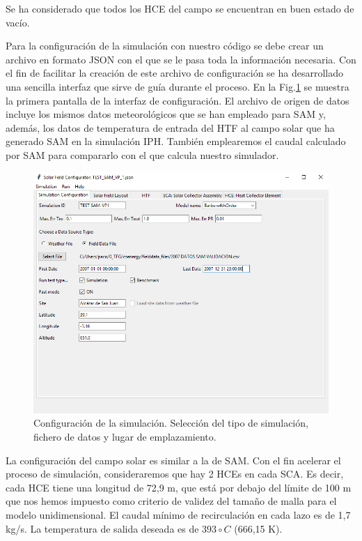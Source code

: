 Se ha considerado que todos los HCE  del campo se encuentran en buen estado de vacío.

Para la configuración de la simulación con nuestro código se debe crear un archivo en formato JSON con el que se le pasa toda la información necesaria. Con el fin de facilitar la creación de este archivo de configuración se ha desarrollado una sencilla interfaz que sirve de guía durante el proceso. En la Fig.\ref{fig:interface01} se muestra la primera pantalla de la interfaz de configuración. El archivo de origen de datos incluye los mismos datos meteorológicos que se han empleado para SAM y, además, los datos de temperatura de entrada del HTF al campo solar que ha generado SAM en la simulación IPH. También emplearemos el caudal calculado por SAM para compararlo con el que calcula nuestro simulador.

\begin{figure}[!h]
\includegraphics[width=0.9\linewidth]{images/interface01.png}
\caption{Configuración de la simulación. Selección del tipo de simulación, fichero de datos y lugar de emplazamiento.} 
\label{fig:interface01}
\end{figure}

La configuración del campo solar es similar a la de SAM. Con el fin acelerar el proceso de simulación, consideraremos que hay 2 HCEs en cada SCA. Es decir, cada HCE tiene una longitud de 72,9 m, que está por debajo del límite de 100 m que nos hemos impuesto como criterio de validez del tamaño de malla para el modelo unidimensional.  El caudal mínimo de recirculación en cada lazo es de 1,7 kg/s. La temperatura de salida deseada es de $393\circ C$ (666,15 K).

